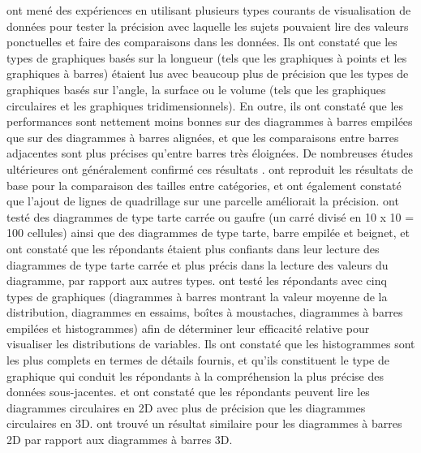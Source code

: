\documentclass[
  french,
]{scrbook}
\begin{document}
\textcite{cleveland1984} ont mené des expériences en utilisant plusieurs types courants de visualisation de données pour tester la précision avec laquelle les sujets pouvaient lire des valeurs ponctuelles et faire des comparaisons dans les données. Ils ont constaté que les types de graphiques basés sur la longueur (tels que les graphiques à points et les graphiques à barres) étaient lus avec beaucoup plus de précision que les types de graphiques basés sur l'angle, la surface ou le volume (tels que les graphiques circulaires et les graphiques tridimensionnels). En outre, ils ont constaté que les performances sont nettement moins bonnes sur des diagrammes à barres empilées que sur des diagrammes à barres alignées, et que les comparaisons entre barres adjacentes sont plus précises qu'entre barres très éloignées. De nombreuses études ultérieures ont généralement confirmé ces résultats \autocite{heer2010,kosara2010,talbot2014}. \textcite{heer2010} ont reproduit les résultats de base pour la comparaison des tailles entre catégories, et ont également constaté que l'ajout de lignes de quadrillage sur une parcelle améliorait la précision. \textcite{kosara2010} ont testé des diagrammes de type tarte carrée ou gaufre (un carré divisé en 10 x 10 = 100 cellules) ainsi que des diagrammes de type tarte, barre empilée et beignet, et ont constaté que les répondants étaient plus confiants dans leur lecture des diagrammes de type tarte carrée et plus précis dans la lecture des valeurs du diagramme, par rapport aux autres types. \textcite{zubiaga2015} ont testé les répondants avec cinq types de graphiques (diagrammes à barres montrant la valeur moyenne de la distribution, diagrammes en essaims, boîtes à moustaches, diagrammes à barres empilées et histogrammes) afin de déterminer leur efficacité relative pour visualiser les distributions de variables. Ils ont constaté que les histogrammes sont les plus complets en termes de détails fournis, et qu'ils constituent le type de graphique qui conduit les répondants à la compréhension la plus précise des données sous-jacentes. \textcite{rangecroft2003} et \textcite{schonlau2012} ont constaté que les répondants peuvent lire les diagrammes circulaires en 2D avec plus de précision que les diagrammes circulaires en 3D. \textcite{zacks1998} ont trouvé un résultat similaire pour les diagrammes à barres 2D par rapport aux diagrammes à barres 3D.
\end{document}
